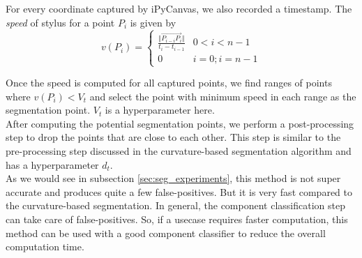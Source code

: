 For every coordinate captured by iPyCanvas, we also recorded a timestamp. The \textit{speed} of stylus for a point $P_i$ is given by
\begin{equation}
	v(P_i) = \begin{cases}
		\frac{\Vert \overrightarrow{P_{i-i} P_i}  \Vert}{t_i - t_{i - 1}} & 0 < i < n - 1\\
		0 & i = 0; i = n-1
	\end{cases}
\end{equation}

Once the speed is computed for all captured points, we find ranges of points where $v(P_i) < V_t$ and select the point with minimum speed in each range as the segmentation point. $V_t$ is a hyperparameter here.\\

After computing the potential segmentation points, we perform a post-processing step to drop the points that are close to each other. This step is similar to the pre-processing step discussed in the curvature-based segmentation algorithm and has a hyperparameter $d_t$.\\

As we would see in subsection \ref{sec:seg_experiments}, this method is not super accurate and produces quite a few false-positives. But it is very fast compared to the curvature-based segmentation. In general, the component classification step can take care of false-positives. So, if a usecase requires faster computation, this method can be used with a good component classifier to reduce the overall computation time.

